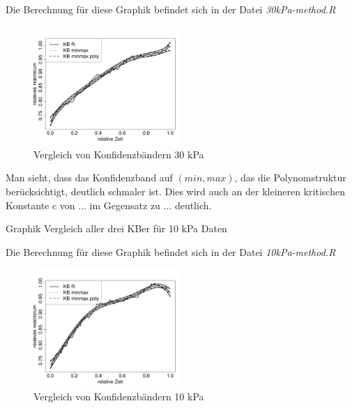 \documentclass[12pt,a4paper]{article}
\theoremstyle{definition}
\theoremstyle{definition}
\theoremstyle{definition}
\theoremstyle{definition}
\begin{document}
Die Berechnung für diese Graphik befindet sich in der Datei \textit{30kPa-method.R}

\begin{figure}[H] 
  \centering
     \includegraphics[width=0.5\textwidth]{30kPa-method.pdf}
  \caption{Vergleich von Konfidenzbändern 30 kPa}
  \label{fig:3}
\end{figure}

Man sieht, dass  das Konfidenzband auf $(min,max)$, das die Polynomstruktur berücksichtigt, deutlich schmaler ist. Dies wird auch an der kleineren kritischen Konstante c von ... im Gegensatz zu ... deutlich.

Graphik Vergleich aller drei KBer für 10 kPa Daten

Die Berechnung für diese Graphik befindet sich in der Datei \textit{10kPa-method.R}

\begin{figure}[H] 
  \centering
     \includegraphics[width=0.5\textwidth]{10kPa-method.pdf}
  \caption{Vergleich von Konfidenzbändern 10 kPa}
  \label{fig:4}
\end{figure}
\end{document}
